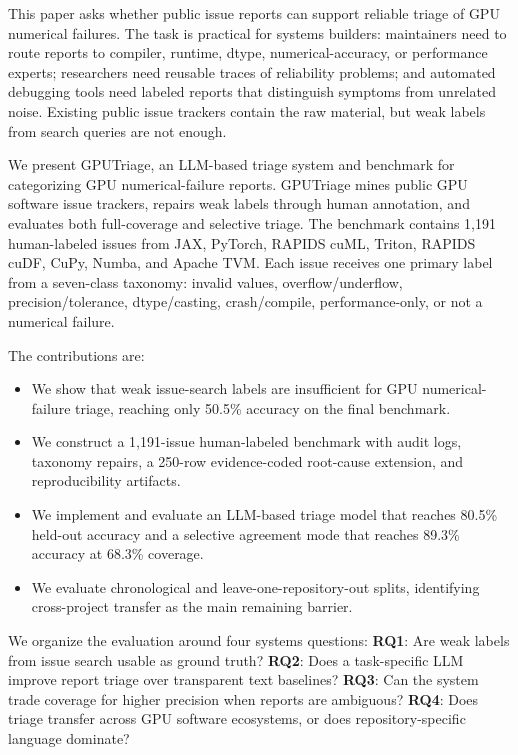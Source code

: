 \documentclass[sigplan,10pt]{acmart}
\newcommand{\system}{GPUTriage}
\begin{document}
This paper asks whether public issue reports can support reliable triage of GPU
numerical failures. The task is practical for systems builders: maintainers
need to route reports to compiler, runtime, dtype, numerical-accuracy, or
performance experts; researchers need reusable traces of reliability problems;
and automated debugging tools need labeled reports that distinguish symptoms
from unrelated noise. Existing public issue trackers contain the raw material,
but weak labels from search queries are not enough.

We present \system{}, an LLM-based triage system and benchmark for categorizing
GPU numerical-failure reports. \system{} mines public GPU software issue
trackers, repairs weak labels through human annotation, and evaluates both
full-coverage and selective triage. The benchmark contains 1,191 human-labeled
issues from JAX, PyTorch, RAPIDS cuML, Triton, RAPIDS cuDF, CuPy, Numba, and
Apache TVM. Each issue receives one primary label from a seven-class taxonomy:
invalid values, overflow/underflow, precision/tolerance, dtype/casting,
crash/compile, performance-only, or not a numerical failure.

The contributions are:
\begin{itemize}
    \item We show that weak issue-search labels are insufficient for GPU
    numerical-failure triage, reaching only 50.5\% accuracy on the final
    benchmark.
    \item We construct a 1,191-issue human-labeled benchmark with audit logs,
    taxonomy repairs, a 250-row evidence-coded root-cause extension, and
    reproducibility artifacts.
    \item We implement and evaluate an LLM-based triage model that reaches
    80.5\% held-out accuracy and a selective agreement mode that reaches
    89.3\% accuracy at 68.3\% coverage.
    \item We evaluate chronological and leave-one-repository-out splits,
    identifying cross-project transfer as the main remaining barrier.
\end{itemize}

We organize the evaluation around four systems questions:
\textbf{RQ1}: Are weak labels from issue search usable as ground truth?
\textbf{RQ2}: Does a task-specific LLM improve report triage over transparent
text baselines? \textbf{RQ3}: Can the system trade coverage for higher
precision when reports are ambiguous? \textbf{RQ4}: Does triage transfer across
GPU software ecosystems, or does repository-specific language dominate?
\end{document}
